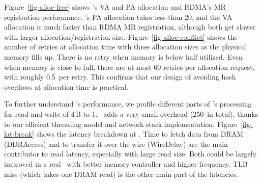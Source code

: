 Figure~\ref{fig-alloc-free} shows \sys's VA and PA allocation and RDMA's MR registration performance.
\sys's PA allocation takes less than 20\mus, and the VA allocation is much faster than RDMA MR registration,
although both get slower with larger allocation/registration size.
Figure~\ref{fig-alloc-conflict} shows the number of retries at allocation time with three allocation sizes as the physical memory fills up.
There is no retry when memory is below half utilized. Even when memory is close to full, there are at most 60 retries per allocation request, with roughly 0.5\ms\ per retry. This confirms that our design of avoiding hash overflows at allocation time is practical.


To further understand \sys's performance, %
we profile different parts of \sys's processing for read and write of 4\,B to 1\KB.
\syslib\ adds a very small overhead (250\ns\ in total), 
thanks to our efficient threading model and network stack implementation.
Figure~\ref{fig-lat-break} shows the latency breakdown at \sysboard.
Time to fetch data from DRAM (DDRAccess) and to transfer it over the wire (WireDelay) are the main 
contributor to read latency, especially with large read size.
Both could be largely improved in a real \sysboard\ with better memory controller and higher frequency.
TLB miss (which takes one DRAM read) is the other main part of the latencies.



